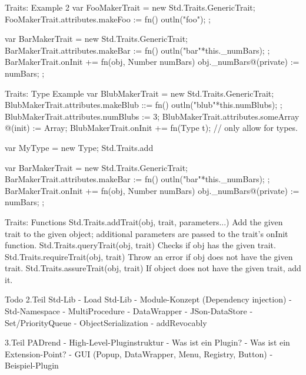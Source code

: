 \documentclass[ucs,9pt]{beamer}
\begin{document}
\begin{frame}{Traits: Example 2}
var FooMakerTrait = new Std.Traits.GenericTrait;
FooMakerTrait.attributes.makeFoo := fn(){ outln("foo"); };

var BarMakerTrait = new Std.Traits.GenericTrait;
BarMakerTrait.attributes.makeBar := fn(){ outln("bar"*this._numBars); };
BarMakerTrait.onInit += fn(obj, Number numBars){
	obj._numBars@(private) := numBars;
};
\end{frame}

\begin{frame}{Traits: Type Example}
var BlubMakerTrait = new Std.Traits.GenericTrait;
BlubMakerTrait.attributes.makeBlub ::= fn(){ outln("blub"*this.numBlubs); };
BlubMakerTrait.attributes.numBlubs := 3;
BlubMakerTrait.attributes.someArray @(init) := Array;
BlubMakerTrait.onInit += fn(Type t){}; // only allow for types.

var MyType = new Type;
Std.Traits.add 

var BarMakerTrait = new Std.Traits.GenericTrait;
BarMakerTrait.attributes.makeBar := fn(){ outln("bar"*this._numBars); };
BarMakerTrait.onInit += fn(obj, Number numBars){
	obj._numBars@(private) := numBars;
};
\end{frame}


\begin{frame}{Traits: Functions}
Std.Traits.addTrait(obj, trait, parameters...)
	Add the given trait to the given object; additional parameters are passed to the trait's onInit function.
Std.Traits.queryTrait(obj, trait)
	Checks if obj has the given trait.
Std.Traits.requireTrait(obj, trait)
	Throw an error if obj does not have the given trait.
Std.Traits.assureTrait(obj, trait)
	If object does not have the given trait, add it.
\end{frame}


\begin{frame}{Todo}
2.Teil Std-Lib
- Load Std-Lib
- Module-Konzept (Dependency injection)
- Std-Namespace
- MultiProcedure
- DataWrapper
- JSon-DataStore
- Set/PriorityQueue
- ObjectSerialization
- addRevocably


3.Teil PADrend
- High-Level-Pluginstruktur
- Was ist ein Plugin?
- Was ist ein Extension-Point?
- GUI (Popup, DataWrapper, Menu, Registry, Button)
- Beispiel-Plugin
\end{frame}


\end{document}
